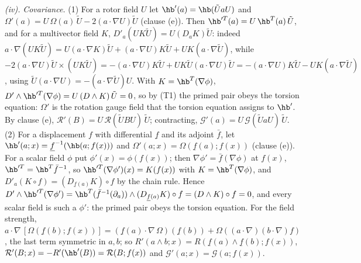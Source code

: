 \emph{(iv).} \emph{Covariance.} (1) For a rotor field $U$ let $\hb'(a) = \hb(\tilde U a U)$ and $\Omega'(a) = U\,\Omega(a)\,\tilde U - 2(a \cdot \nabla U)\tilde U$ (clause (e)). Then $\hb'^{T}(a) = U\,\hb^{T}(a)\,\tilde U$, and for a multivector field $K$, $D'_{a}(UK\tilde U) = U(D_{a}K)\tilde U$: indeed $a \cdot \nabla(UK\tilde U) = U(a \cdot \nabla K)\tilde U + (a \cdot \nabla U)K\tilde U + UK(a \cdot \nabla\tilde U)$, while $-2(a \cdot \nabla U)\tilde U \times (UK\tilde U) = -(a \cdot \nabla U)K\tilde U + UK\tilde U(a \cdot \nabla U)\tilde U = -(a \cdot \nabla U)K\tilde U - UK(a \cdot \nabla\tilde U)$, using $\tilde U(a \cdot \nabla U) = -(a \cdot \nabla\tilde U)U$. With $K = \hb^{T}(\nabla\phi)$, $D' \wedge \hb'^{T}(\nabla\phi) = U\,(D \wedge K)\,\tilde U = 0$, so by (T1) the primed pair obeys the torsion equation: $\Omega'$ is the rotation gauge field that the torsion equation assigns to $\hb'$. By clause (e), $\mathcal{R}'(B) = U\,\mathcal{R}(\tilde U B U)\,\tilde U$; contracting, $\mathcal{G}'(a) = U\,\mathcal{G}(\tilde U a U)\,\tilde U$. (2) For a displacement $f$ with differential $\underline{f}$ and its adjoint $\bar f$, let $\hb'(a; x) = \underline{f}^{-1}(\hb(a; f(x)))$ and $\Omega'(a; x) = \Omega(\underline{f}(a); f(x))$ (clause (e)). For a scalar field $\phi$ put $\phi'(x) = \phi(f(x))$; then $\nabla\phi' = \bar f(\nabla\phi)$ at $f(x)$, $\hb'^{T} = \hb^{T}\bar f^{-1}$, so $\hb'^{T}(\nabla\phi')(x) = K(f(x))$ with $K = \hb^{T}(\nabla\phi)$, and $D'_{a}(K \circ f) = (D_{\underline{f}(a)}K) \circ f$ by the chain rule. Hence $D' \wedge \hb'^{T}(\nabla\phi') = \hb^{T}(\bar f^{-1}(\partial_{a})) \wedge (D_{\underline{f}(a)}K) \circ f = (D \wedge K) \circ f = 0$, and every scalar field is such a $\phi'$: the primed pair obeys the torsion equation. For the field strength, $a \cdot \nabla\,[\Omega(\underline{f}(b); f(x))] = (\underline{f}(a) \cdot \nabla\,\Omega)(\underline{f}(b)) + \Omega((a \cdot \nabla)(b \cdot \nabla)f)$, the last term symmetric in $a, b$; so $R'(a \wedge b; x) = R(\underline{f}(a) \wedge \underline{f}(b); f(x))$, $\mathcal{R}'(B; x) = -R'(\hb'(B)) = \mathcal{R}(B; f(x))$ and $\mathcal{G}'(a; x) = \mathcal{G}(a; f(x))$.

